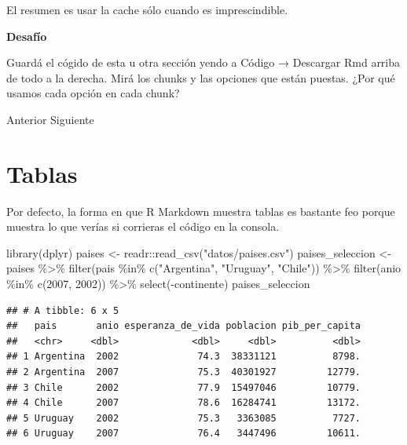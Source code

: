 \documentclass[
  openany]{book}
\newenvironment{Shaded}{\begin{snugshade}}{\end{snugshade}}
\newcommand{\DecValTok}[1]{\textcolor[rgb]{0.00,0.00,0.81}{#1}}
\newcommand{\FunctionTok}[1]{\textcolor[rgb]{0.00,0.00,0.00}{#1}}
\newcommand{\NormalTok}[1]{#1}
\newcommand{\OtherTok}[1]{\textcolor[rgb]{0.56,0.35,0.01}{#1}}
\newcommand{\SpecialCharTok}[1]{\textcolor[rgb]{0.00,0.00,0.00}{#1}}
\newcommand{\StringTok}[1]{\textcolor[rgb]{0.31,0.60,0.02}{#1}}
\begin{document}
El resumen es usar la cache sólo cuando es imprescindible.

\textbf{Desafío}

Guardá el cógido de esta u otra sección yendo a Código → Descargar Rmd arriba de todo a la derecha. Mirá los chunks y las opciones que están puestas. ¿Por qué usamos cada opción en cada chunk?

Anterior
Siguiente

\hypertarget{tablas}{%
\chapter{Tablas}\label{tablas}}

Por defecto, la forma en que R Markdown muestra tablas es bastante feo porque muestra lo que verías si corrieras el código en la consola.

\begin{Shaded}
\begin{Highlighting}[]
\FunctionTok{library}\NormalTok{(dplyr)}
\NormalTok{paises }\OtherTok{\textless{}{-}}\NormalTok{ readr}\SpecialCharTok{::}\FunctionTok{read\_csv}\NormalTok{(}\StringTok{"datos/paises.csv"}\NormalTok{)}
\NormalTok{paises\_seleccion }\OtherTok{\textless{}{-}}\NormalTok{ paises }\SpecialCharTok{\%\textgreater{}\%} 
  \FunctionTok{filter}\NormalTok{(pais }\SpecialCharTok{\%in\%} \FunctionTok{c}\NormalTok{(}\StringTok{"Argentina"}\NormalTok{, }\StringTok{"Uruguay"}\NormalTok{, }\StringTok{"Chile"}\NormalTok{)) }\SpecialCharTok{\%\textgreater{}\%} 
  \FunctionTok{filter}\NormalTok{(anio }\SpecialCharTok{\%in\%} \FunctionTok{c}\NormalTok{(}\DecValTok{2007}\NormalTok{, }\DecValTok{2002}\NormalTok{)) }\SpecialCharTok{\%\textgreater{}\%}
  \FunctionTok{select}\NormalTok{(}\SpecialCharTok{{-}}\NormalTok{continente)}
\NormalTok{paises\_seleccion}
\end{Highlighting}
\end{Shaded}

\begin{verbatim}
## # A tibble: 6 x 5
##   pais       anio esperanza_de_vida poblacion pib_per_capita
##   <chr>     <dbl>             <dbl>     <dbl>          <dbl>
## 1 Argentina  2002              74.3  38331121          8798.
## 2 Argentina  2007              75.3  40301927         12779.
## 3 Chile      2002              77.9  15497046         10779.
## 4 Chile      2007              78.6  16284741         13172.
## 5 Uruguay    2002              75.3   3363085          7727.
## 6 Uruguay    2007              76.4   3447496         10611.
\end{verbatim}
\end{document}
